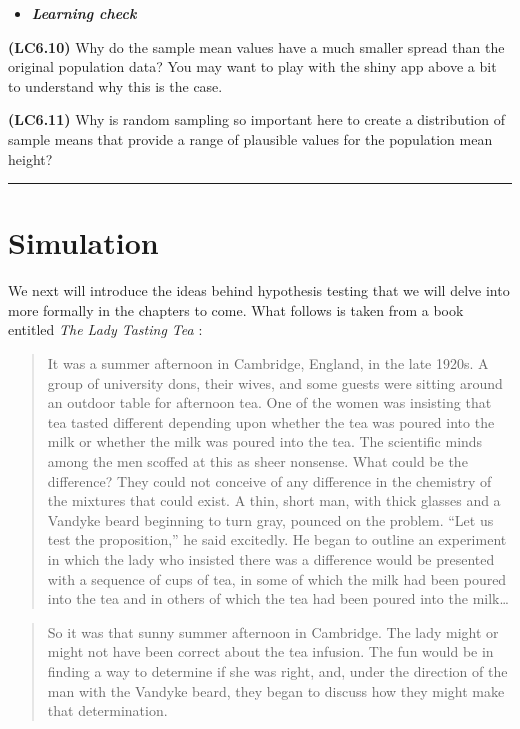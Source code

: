 \documentclass[]{tufte-book}
\let\oldrule=\rule
\renewcommand{\rule}[1]{\oldrule{\linewidth}}
\newenvironment{rmdblock}[1]
  {\begin{shaded*}
  \begin{itemize}
  \renewcommand{\labelitemi}{
    \raisebox{-.7\height}[0pt][0pt]{
    }
  }
  \item
  }
  {
  \end{itemize}
  \end{shaded*}
  }
\newenvironment{learncheck}
  {\begin{rmdblock}{warning}}
  {\end{rmdblock}}
\begin{document}
\begin{learncheck}
\textbf{\emph{Learning check}}
\end{learncheck}

\textbf{(LC6.10)} Why do the sample mean values have a much smaller
spread than the original population data? You may want to play with the
shiny app above a bit to understand why this is the case.

\textbf{(LC6.11)} Why is random sampling so important here to create a
distribution of sample means that provide a range of plausible values
for the population mean height?

\begin{center}\rule{0.5\linewidth}{\linethickness}\end{center}

\section{Simulation}\label{simulation}

We next will introduce the ideas behind hypothesis testing that we will
delve into more formally in the chapters to come. What follows is taken
from a book entitled \emph{The Lady Tasting Tea} \citep{salsburg2001}:

\begin{quote}
It was a summer afternoon in Cambridge, England, in the late 1920s. A
group of university dons, their wives, and some guests were sitting
around an outdoor table for afternoon tea. One of the women was
insisting that tea tasted different depending upon whether the tea was
poured into the milk or whether the milk was poured into the tea. The
scientific minds among the men scoffed at this as sheer nonsense. What
could be the difference? They could not conceive of any difference in
the chemistry of the mixtures that could exist. A thin, short man, with
thick glasses and a Vandyke beard beginning to turn gray, pounced on the
problem. ``Let us test the proposition,'' he said excitedly. He began to
outline an experiment in which the lady who insisted there was a
difference would be presented with a sequence of cups of tea, in some of
which the milk had been poured into the tea and in others of which the
tea had been poured into the milk\ldots{}
\end{quote}

\begin{quote}
So it was that sunny summer afternoon in Cambridge. The lady might or
might not have been correct about the tea infusion. The fun would be in
finding a way to determine if she was right, and, under the direction of
the man with the Vandyke beard, they began to discuss how they might
make that determination.
\end{quote}
\end{document}
